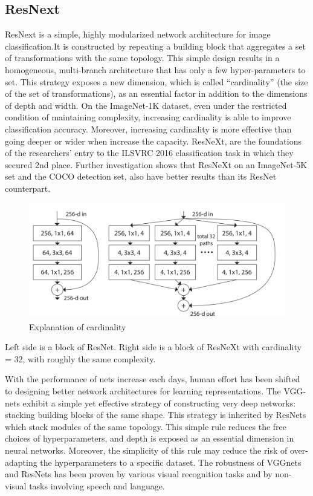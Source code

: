 \subsection{ResNext}
ResNext is a simple, highly modularized network architecture for image classification.It is constructed
by repeating a building block that aggregates a set of transformations with the same topology. This simple design results in a homogeneous, multi-branch architecture that has only a few hyper-parameters to set. This strategy exposes a
new dimension, which is called “cardinality” (the size of the
set of transformations), as an essential factor in addition to
the dimensions of depth and width. On the ImageNet-1K
dataset, even under the restricted
condition of maintaining complexity, increasing cardinality
is able to improve classification accuracy. Moreover, increasing cardinality is more effective than going deeper or
wider when increase the capacity. ResNeXt, are the foundations of the researchers' entry to the ILSVRC
2016 classification task in which they secured 2nd place.
Further investigation shows that ResNeXt on an ImageNet-5K set and
the COCO detection set, also have better results than
its ResNet counterpart. 


\begin{figure}[H]
  \centering
  \includegraphics[width=\linewidth]{figs/cardinality.png}
  \caption{Explanation of cardinality}
  \label{fig:example}
\end{figure}
Left side is a block of ResNet. Right side is a block of
ResNeXt with cardinality = 32, with roughly the same complexity. 

With the performance of nets increase each days, human effort has been shifted to designing
better network architectures for learning representations. The VGG-nets exhibit a simple yet effective strategy of constructing very deep networks: stacking building blocks of the same shape. This strategy is inherited
by ResNets which stack modules of the same topology. This simple rule reduces the free choices of hyperparameters, and depth is exposed as an essential dimension
in neural networks. Moreover, the simplicity
of this rule may reduce the risk of over-adapting the hyperparameters to a specific dataset. The robustness of VGGnets and ResNets has been proven by various visual recognition tasks and by non-visual tasks
involving speech and language.

